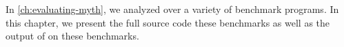 In \autoref{ch:evaluating-myth}, we analyzed \myth{} over a variety of benchmark programs.
In this chapter, we present the full source code these benchmarks as well as the output of \myth{} on these benchmarks.

